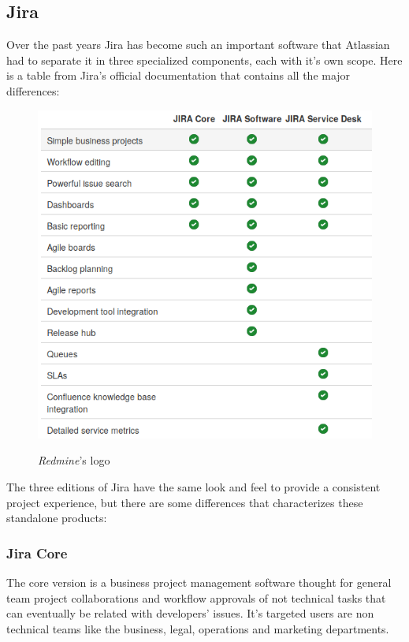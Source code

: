 	\subsection{Jira}
		Over the past years Jira has become such an important software that Atlassian had to separate it in three specialized components, each with it's own scope.
		Here is a table from Jira's official documentation that contains all the major differences:
		\begin{figure}[H]
			\centering
			\includegraphics[width=\textwidth]{resources/jira_type}\\
			\caption{\textit{Redmine}'s logo}
		\end{figure}
		The three editions of Jira have the same look and feel to provide a consistent project experience, but there are some differences that characterizes these standalone products\cite{what-are-the-differences}:
		\subsubsection{Jira Core}
			The core version is a business project management software thought for general team project collaborations and workflow approvals of not technical tasks that can eventually be related with developers' issues.
			It's targeted users are non technical teams like the business, legal, operations and marketing departments.
			
